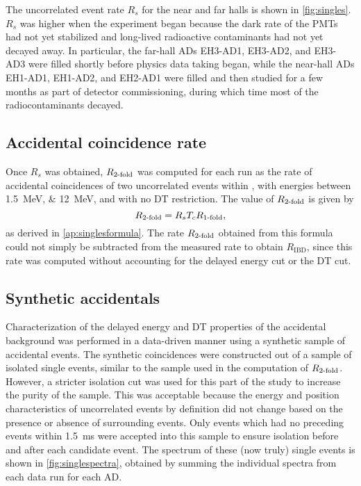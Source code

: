 The uncorrelated event rate $R_s$ for the near and far halls is shown in
\cref{fig:singles}.
$R_s$ was higher when the experiment began because
the dark rate of the PMTs had not yet stabilized
and long-lived
radioactive contaminants had not yet decayed away.
In particular, the far-hall ADs EH3-AD1, EH3-AD2, and EH3-AD3
were filled shortly before physics data taking began,
while the near-hall ADs EH1-AD1, EH1-AD2, and EH2-AD1
were filled and then studied for a few months
as part of detector commissioning, during which time
most of the radiocontaminants decayed.

\subsection{Accidental coincidence rate}
\label{subsec:2fold}

Once $R_s$ was obtained, $R_{\text{\ensuremath{2}-fold}}$ was computed for each run
as the rate of accidental coincidences of two uncorrelated events within \tc{},
with energies between \SIlist{1.5;12}{\MeV}, and with no DT restriction.
The value of $R_\text{\ensuremath{2}-fold}$ is given by
\begin{equation}
    \label{eq:racc}
        R_{\text{\ensuremath{2}-fold}} = R_sT_c R_{\text{\ensuremath{1}-fold}},
\end{equation}
as derived in \cref{ap:singlesformula}.
The rate $R_{\text{\ensuremath{2}-fold}}$ obtained from this formula
could not simply be subtracted from the measured  rate
to obtain $R_{\text{IBD}}$,
since this rate was computed without accounting
for the delayed energy cut or the DT cut.

\subsection{Synthetic accidentals}
\label{subsec:synthetic}

Characterization of the delayed energy and DT properties
of the accidental background
was performed in a data-driven manner using
a synthetic sample of accidental events.
The synthetic coincidences were constructed out of a sample of isolated single events,
similar to the sample used in the computation of $R_\text{\ensuremath{2}-fold}$.
However, a stricter isolation cut was used for this part of the study
to increase the purity of the sample.
This was acceptable because the energy and position characteristics of uncorrelated events
by definition did not change based on the presence or absence
of surrounding events.
Only  events which had no preceding events within \SI{1.5}{\ms}
were accepted into this sample
to ensure isolation before and after each candidate event.
The spectrum of these (now truly) single events is shown in \cref{fig:singlespectra},
obtained by summing the individual spectra from each data run for each AD.

